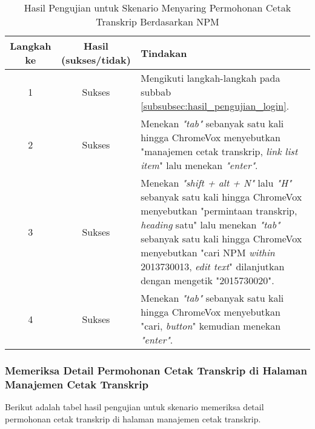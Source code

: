 \begin{table}[H]
    \centering 
    \caption{Hasil Pengujian untuk Skenario Menyaring Permohonan Cetak Transkrip Berdasarkan NPM}
    \label{tab:hasil_pengujian_menyaring_permohonan_cetak_transkrip_berdasarkan_npm}
    \begin{tabular}{|c|c|p{10cm}|}
        \toprule
        Langkah ke & Hasil (sukses/tidak) & Tindakan \\

        \midrule
        1 & Sukses & Mengikuti langkah-langkah pada subbab \ref{subsubsec:hasil_pengujian_login}. \\
        2 & Sukses & Menekan \textit{"tab"} sebanyak satu kali hingga ChromeVox menyebutkan "manajemen cetak transkrip, \textit{link list item}" lalu menekan \textit{"enter"}. \\
        3 & Sukses & Menekan \textit{"shift + alt + N"} lalu \textit{"H"} sebanyak satu kali hingga ChromeVox menyebutkan "permintaan transkrip, \textit{heading} satu" lalu menekan \textit{"tab"} sebanyak satu kali hingga ChromeVox menyebutkan "cari NPM \textit{within} 2013730013, \textit{edit text}" dilanjutkan dengan mengetik "2015730020". \\
        4 & Sukses & Menekan \textit{"tab"} sebanyak satu kali hingga ChromeVox menyebutkan "cari, \textit{button}" kemudian menekan \textit{"enter"}. \\

        \bottomrule

    \end{tabular}
\end{table}

\subsubsection{Memeriksa Detail Permohonan Cetak Transkrip di Halaman Manajemen Cetak Transkrip}
\label{subsubsec:hasil_pengujian_memeriksa_detail_permohonan_cetak_transkrip_di_halaman_manajemen_cetak_transkrip}
Berikut adalah tabel hasil pengujian untuk skenario memeriksa detail permohonan cetak transkrip di halaman manajemen cetak transkrip.

